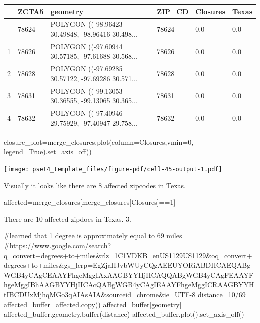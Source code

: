 \documentclass[
  letterpaper,
  DIV=11,
  numbers=noendperiod]{scrartcl}
\newenvironment{Shaded}{\begin{snugshade}}{\end{snugshade}}
\newcommand{\BuiltInTok}[1]{\textcolor[rgb]{0.00,0.23,0.31}{#1}}
\newcommand{\CommentTok}[1]{\textcolor[rgb]{0.37,0.37,0.37}{#1}}
\newcommand{\DecValTok}[1]{\textcolor[rgb]{0.68,0.00,0.00}{#1}}
\newcommand{\NormalTok}[1]{\textcolor[rgb]{0.00,0.23,0.31}{#1}}
\newcommand{\OperatorTok}[1]{\textcolor[rgb]{0.37,0.37,0.37}{#1}}
\newcommand{\StringTok}[1]{\textcolor[rgb]{0.13,0.47,0.30}{#1}}
\newcommand{\VariableTok}[1]{\textcolor[rgb]{0.07,0.07,0.07}{#1}}
\begin{document}
\begin{longtable}[]{@{}llllll@{}}
\toprule\noalign{}
& ZCTA5 & geometry & ZIP\_CD & Closures & Texas \\
\midrule\noalign{}
\endhead
\bottomrule\noalign{}
\endlastfoot
0 & 78624 & POLYGON ((-98.96423 30.49848, -98.96416 30.498... & 78624 &
0.0 & 0.0 \\
1 & 78626 & POLYGON ((-97.60944 30.57185, -97.61688 30.568... & 78626 &
0.0 & 0.0 \\
2 & 78628 & POLYGON ((-97.69285 30.57122, -97.69286 30.571... & 78628 &
0.0 & 0.0 \\
3 & 78631 & POLYGON ((-99.13053 30.36555, -99.13065 30.365... & 78631 &
0.0 & 0.0 \\
4 & 78632 & POLYGON ((-97.40946 29.75929, -97.40947 29.758... & 78632 &
0.0 & 0.0 \\
\end{longtable}

\begin{Shaded}
\begin{Highlighting}[]
\NormalTok{closure\_plot}\OperatorTok{=}\NormalTok{merge\_closures.plot(column}\OperatorTok{=}\StringTok{\textquotesingle{}Closures\textquotesingle{}}\NormalTok{,vmin}\OperatorTok{=}\DecValTok{0}\NormalTok{, legend}\OperatorTok{=}\VariableTok{True}\NormalTok{).set\_axis\_off()}
\end{Highlighting}
\end{Shaded}

\texttt{[image: pset4\_template\_files/figure-pdf/cell-45-output-1.pdf]}

Visually it looks like there are 8 affected zipcodes in Texas.

\begin{Shaded}
\begin{Highlighting}[]
\NormalTok{affected}\OperatorTok{=}\NormalTok{merge\_closures[merge\_closures[}\StringTok{\textquotesingle{}Closures\textquotesingle{}}\NormalTok{]}\OperatorTok{==}\DecValTok{1}\NormalTok{]}
\end{Highlighting}
\end{Shaded}

There are 10 affected zipdoes in Texas. 3.

\begin{Shaded}
\begin{Highlighting}[]
\CommentTok{\#learned that 1 degree is approximately equal to 69 miles}
\CommentTok{\#https://www.google.com/search?q=convert+degrees+to+miles\&rlz=1C1VDKB\_enUS1129US1129\&oq=convert+degrees+to+miles\&gs\_lcrp=EgZjaHJvbWUyCQgAEEUYORiABDIICAEQABgWGB4yCAgCEAAYFhgeMggIAxAAGBYYHjIICAQQABgWGB4yCAgFEAAYFhgeMggIBhAAGBYYHjIICAcQABgWGB4yCAgIEAAYFhgeMggICRAAGBYYHtIBCDUxMjhqMGo3qAIAsAIA\&sourceid=chrome\&ie=UTF{-}8}
\NormalTok{distance}\OperatorTok{=}\DecValTok{10}\OperatorTok{/}\DecValTok{69}
\NormalTok{affected\_buffer}\OperatorTok{=}\NormalTok{affected.copy()}
\NormalTok{affected\_buffer[}\StringTok{\textquotesingle{}geometry\textquotesingle{}}\NormalTok{]}\OperatorTok{=}\NormalTok{ affected\_buffer.geometry.}\BuiltInTok{buffer}\NormalTok{(distance)}
\NormalTok{affected\_buffer.plot().set\_axis\_off()}
\end{Highlighting}
\end{Shaded}
\end{document}
